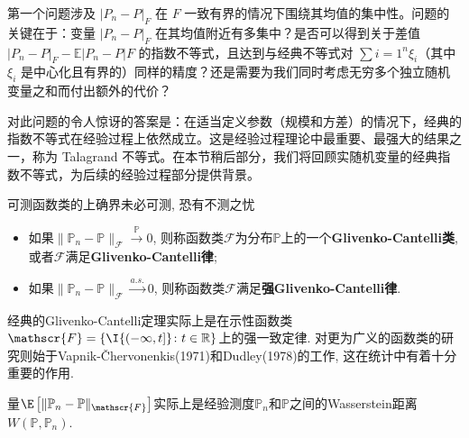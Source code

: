 第一个问题涉及 $| P_n - P |_F$ 在 $F$ 一致有界的情况下围绕其均值的集中性。问题的关键在于：变量 $| P_n - P |_F$ 在其均值附近有多集中？是否可以得到关于差值 $| P_n - P |_F - \mathbb{E} | P_n - P |F$ 的指数不等式，且达到与经典不等式对 $\sum{i=1}^n \xi_i$（其中 $\xi_i$ 是中心化且有界的）同样的精度？还是需要为我们同时考虑无穷多个独立随机变量之和而付出额外的代价？

对此问题的令人惊讶的答案是：在适当定义参数（规模和方差）的情况下，经典的指数不等式在经验过程上依然成立。这是经验过程理论中最重要、最强大的结果之一，称为 Talagrand 不等式。在本节稍后部分，我们将回顾实随机变量的经典指数不等式，为后续的经验过程部分提供背景。

可测函数类的上确界未必可测, 恐有不测之忧

\begin{itemize}
	\item 如果$\|\mathbb{P}_n - \mathbb{P}\|_{\mathscr{F}} \stackrel{\mathbb{P}}{\to} 0$, 则称函数类$\mathscr{F}$为分布$\mathbb{P}$上的一个\textbf{Glivenko-Cantelli类}, 或者$\mathscr{F}$满足\textbf{Glivenko-Cantelli律}; 
	\item 如果$\|\mathbb{P}_n - \mathbb{P}\|_{\mathscr{F}} \stackrel{a.s.}{\to} 0$, 则称函数类$\mathscr{F}$满足\textbf{强Glivenko-Cantelli律}. 
\end{itemize}
经典的Glivenko-Cantelli定理实际上是在示性函数类$\mathscr{F} = \{\I{(- \infty, t]} \colon t \in \mathbb{R} \}$上的强一致定律. 
对更为广义的函数类的研究则始于Vapnik-Čhervonenkis(1971)和Dudley(1978)的工作, 这在统计中有着十分重要的作用. 

量$\E\left[\|\mathbb{P}_n - \mathbb{P}\|_{\mathscr{F}}\right]$实际上是经验测度$\mathbb{P}_n$和$\mathbb{P}$之间的Wasserstein距离$W(\mathbb{P}, \mathbb{P}_n)$. 

